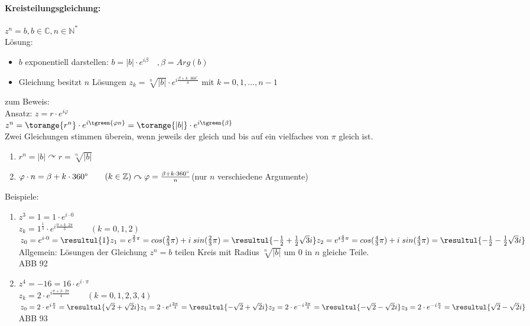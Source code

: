 \paragraph{Kreisteilungsgleichung:} \parskp
$\boxed{z^n=b}, b\in \mathbb{C}, n\in \mathbb{N}^*$\\
Lösung:
\begin{itemize}
\item $b$ exponentiell darstellen: $b=|b| \cdot e ^{i\beta} \quad , \beta = Arg(b)$
\item Gleichung besitzt $n$ Lösungen $\boxed{z_k=\sqrt[n]{|b|}\cdot e^{i\frac{\beta+k\cdot 360^{\circ}}{n}}}$ \qquad mit $k=0,1,...,n-1$
\end{itemize}
zum Beweis: \\
Ansatz: $z=r\cdot e^{i\varphi}$\\
$z^n=\torange{r^n}\cdot e^{i\tgreen{\varphi n}}=\torange{|b|} \cdot e^{i\tgreen{\beta}}$\\
Zwei Gleichungen stimmen überein, wenn jeweils der  gleich und  bis auf ein vielfaches von $\pi$ gleich ist.
\begin{enumerate}
\item $r^n=|b| \curvearrowright r = \sqrt[n]{|b|}$
\item $\varphi \cdot n = \beta + k \cdot 360^{\circ} \qquad (k \in \mathbb{Z})\\
\curvearrowright \varphi = \frac{\beta + k \cdot 360^{\circ}}{n}$\qquad (nur $n$ verschiedene Argumente)
\end{enumerate}
Beispiele:
\begin{enumerate}[label=\alph*.)]
\item $z^3=1=1\cdot e^{i\cdot 0}$\\
$z_k=1^{\frac{1}{3}}\cdot e^{i\frac{0+k\cdot 2 \pi}{3}} \qquad (k=0,1,2)$\\
$z_0=e^{i\cdot 0}=\resultul{1}\\
z_1= e^{\frac{2}{3}\pi}=cos(\frac{2}{3}\pi)+i\; sin (\frac{2}{3}\pi)=\resultul{-\frac{1}{2}+\frac{1}{2}\sqrt{3}i}\\
z_2=e^{i\frac{4}{3}\pi}=cos(\frac{4}{3}\pi)+i\; sin(\frac{4}{3}\pi)=\resultul{-\frac{1}{2}-\frac{1}{2}\sqrt{3}i}$\\
Allgemein: Lösungen der Gleichung $z^n=b$ teilen Kreis mit Radius $\sqrt[n]{|b|}$ um $0$ in $n$ gleiche Teile.\\
ABB 92
\item $z^4=-16=16\cdot e^{i\cdot \pi}$\\
$z_k=2\cdot e^{i\frac{\pi + k \cdot 2\pi}{4}} \qquad (k=0,1,2,3,4)$\\
$z_0=2\cdot e^{i\frac{\pi}{4}}=\resultul{\sqrt{2}+\sqrt{2}i}\\
z_1=2\cdot e^{i\frac{3\pi}{4}}=\resultul{-\sqrt{2}+\sqrt{2}i}\\
z_2=2\cdot e^{-i\frac{3\pi}{4}}=\resultul{-\sqrt{2}-\sqrt{2}i}\\
z_3=2\cdot e^{-i\frac{\pi}{4}}=\resultul{\sqrt{2}-\sqrt{2}i}$\\
ABB 93
\end{enumerate}
